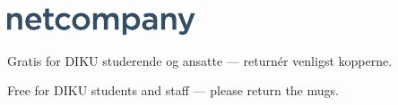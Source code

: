 \documentclass{article}
\begin{document}
\maketitle

\null
\vspace{-1.5cm}


\vspace{0.1in}

\begin{center}

\includegraphics[scale=4]{billeder/netcompany-logo.pdf}

\end{center}

\vspace{0.2in}

\begin{center}

\huge Gratis for DIKU studerende og ansatte --- returnér venligst kopperne.

\english

\huge Free for DIKU students and staff --- please return the mugs.

\end{center}

\dansk

\underskriv
\end{document}
